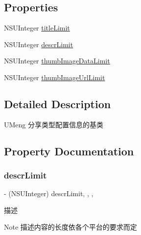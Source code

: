 \subsection*{Properties}
\begin{DoxyCompactItemize}
\item 
N\+S\+U\+Integer \mbox{\hyperlink{interface_u_m_social_share_object_config_a1b96d0dc47c2aa8ceaf9cee8fc150247}{title\+Limit}}
\item 
N\+S\+U\+Integer \mbox{\hyperlink{interface_u_m_social_share_object_config_ad0fa64eb1a26a71894fe2c6ce0121f99}{descr\+Limit}}
\item 
N\+S\+U\+Integer \mbox{\hyperlink{interface_u_m_social_share_object_config_a4a194c4b7068d02a5d7586e85901bb3a}{thumb\+Image\+Data\+Limit}}
\item 
N\+S\+U\+Integer \mbox{\hyperlink{interface_u_m_social_share_object_config_ae074e3149a60db769448a27563fc80f4}{thumb\+Image\+Url\+Limit}}
\end{DoxyCompactItemize}


\subsection{Detailed Description}
U\+Meng 分享类型配置信息的基类 

\subsection{Property Documentation}
\mbox{\label{interface_u_m_social_share_object_config_ad0fa64eb1a26a71894fe2c6ce0121f99}} 
\subsubsection{\texorpdfstring{descr\+Limit}{descrLimit}}
{\footnotesize\ttfamily -\/ (N\+S\+U\+Integer) descr\+Limit\hspace{0.3cm}{\ttfamily [read]}, {\ttfamily [write]}, {\ttfamily [nonatomic]}, {\ttfamily [assign]}}

描述 \begin{DoxyNote}{Note}
描述内容的长度依各个平台的要求而定 
\end{DoxyNote}
\mbox{\label{interface_u_m_social_share_object_config_a4a194c4b7068d02a5d7586e85901bb3a}} 

